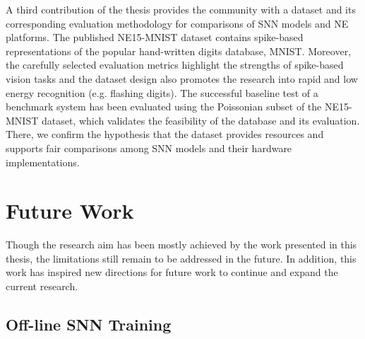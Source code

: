 A third contribution of the thesis provides the community with a dataset and its corresponding evaluation methodology for comparisons of SNN models and NE platforms.
The published NE15-MNIST dataset contains spike-based representations of the popular hand-written digits database, MNIST.
Moreover, the carefully selected evaluation metrics highlight the strengths of spike-based vision tasks and the dataset design also promotes the research into rapid and low energy recognition (e.g. flashing digits).
The successful baseline test of a benchmark system has been evaluated using the Poissonian subset of the NE15-MNIST dataset, which validates the feasibility of the database and its evaluation.
There, we confirm the hypothesis that the dataset provides resources and supports fair comparisons among SNN models and their hardware implementations.

%



\section{Future Work}
Though the research aim has been mostly achieved by the work presented in this thesis, the limitations still remain to be addressed in the future.
In addition, this work has inspired new directions for future work to continue and expand the current research.

\subsection{Off-line SNN Training}

